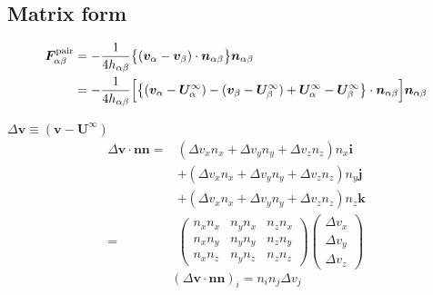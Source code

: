 \documentclass[11pt]{scrartcl}
\begin{document}
\subsection*{Matrix form}
\begin{align*}
 \bm{F}_{\alpha\beta}^{\mathrm{pair}}
&= 
- \frac{1}{4 h_{\alpha\beta}}
\bigl\{
(\bm{v}_\alpha-
\bm{v}_\beta)\cdot
\bm{n}_{\alpha\beta}
\bigr\}\bm{n}_{\alpha\beta} \\
&=
- \frac{1}{4 h_{\alpha\beta}}
\Bigl[
\bigl\{
(\bm{v}_\alpha- \bm{U}^{\infty}_\alpha)-
(\bm{v}_\beta- \bm{U}^{\infty}_\beta)
+ \bm{U}^{\infty}_\alpha
- \bm{U}^{\infty}_\beta
\bigr\}\cdot
\bm{n}_{\alpha\beta}
\Bigr]
\bm{n}_{\alpha\beta}
\end{align*}


$\Delta \bm{v} \equiv (\bm{v}- \bm{U}^{\infty})$
\begin{align*}
\Delta \bm{v} \cdot
\bm{n} \bm{n}
= &
(\Delta v_x n_x 
+\Delta v_y n_y
+\Delta v_z n_z) n_x \bm{i}\\
& 
+ (\Delta v_x n_x 
+\Delta v_y n_y
+\Delta v_z n_z) n_y \bm{j}\\
&
+ (\Delta v_x n_x 
+\Delta v_y n_y
+\Delta v_z n_z) n_z \bm{k} \\
=&
\begin{pmatrix}
 n_x n_x &   n_y n_x &   n_z n_x \\
 n_x n_y &   n_y n_y &   n_z n_y \\
 n_x n_z &   n_y n_z &   n_z n_z 
\end{pmatrix}
\begin{pmatrix}
 \Delta v_x \\
 \Delta v_y \\
 \Delta v_z 
\end{pmatrix} 
\end{align*}
\begin{equation*}
(\Delta \bm{v} \cdot
\bm{n} \bm{n})_i
= n_i n_j \Delta v_j
\end{equation*}
\end{document}
